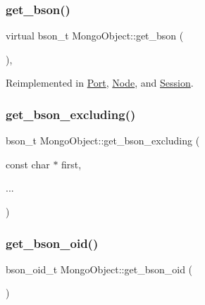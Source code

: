 \mbox{\label{class_mongo_object_ac21cbe104a818f7e6ee7dcfbb521e9e1}} 
\subsubsection{\texorpdfstring{get\+\_\+bson()}{get\_bson()}}
{\footnotesize\ttfamily virtual bson\+\_\+t Mongo\+Object\+::get\+\_\+bson (\begin{DoxyParamCaption}{ }\end{DoxyParamCaption})\hspace{0.3cm}{\ttfamily [protected]}, {\ttfamily [virtual]}}



Reimplemented in \hyperlink{class_port_a746914b62d482cc81a901d254a03c560}{Port}, \hyperlink{class_node_a9568e1bba3436d78e77862902e328592}{Node}, and \hyperlink{class_session_aa517fe6138a0cc32e27ddf1eb7331520}{Session}.

\mbox{\label{class_mongo_object_ac35c66d91e7297eb46313b98d01751cb}} 
\subsubsection{\texorpdfstring{get\+\_\+bson\+\_\+excluding()}{get\_bson\_excluding()}}
{\footnotesize\ttfamily bson\+\_\+t Mongo\+Object\+::get\+\_\+bson\+\_\+excluding (\begin{DoxyParamCaption}\item[{const char $\ast$}]{first,  }\item[{}]{... }\end{DoxyParamCaption})\hspace{0.3cm}{\ttfamily [protected]}}

\mbox{\label{class_mongo_object_aaca278b427d042a63caf2962b5e76043}} 
\subsubsection{\texorpdfstring{get\+\_\+bson\+\_\+oid()}{get\_bson\_oid()}}
{\footnotesize\ttfamily bson\+\_\+oid\+\_\+t Mongo\+Object\+::get\+\_\+bson\+\_\+oid (\begin{DoxyParamCaption}{ }\end{DoxyParamCaption})\hspace{0.3cm}{\ttfamily [protected]}}


